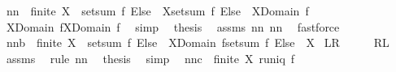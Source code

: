 \begin{isabellebody}
\isanewline
{}\isamarkupfalse%
\ nn{}{}{\isacharcolon}\ \ {\isachardoublequoteopen}finite\ X{\isachardoublequoteclose}\ \ {\isachardoublequoteopen}setsum\ {\isacharparenleft}f\ Else\ {}{\isacharparenright}\ X{\isacharequal}setsum\ {\isacharparenleft}f\ Else\ {}{\isacharparenright}\ {\isacharparenleft}X{\isasyminter}Domain\ f{\isacharparenright}{\isachardoublequoteclose}\ \isanewline
%
\isadelimproof
%
\endisadelimproof
%
\isatagproof
{}\isamarkupfalse%
{\isacharminus}\ \isamarkupfalse%
\ {\isachardoublequoteopen}X{\isasyminter}Domain\ f{\isacharequal}X{\isacharminus}{\isacharparenleft}{\isacharminus}Domain\ f{\isacharparenright}{\isachardoublequoteclose}\ \isamarkupfalse%
\ simp\ \isamarkupfalse%
\ {\isacharquery}thesis\ \isamarkupfalse%
\ assms\ nn{}{}\ nn{}{}\ \isamarkupfalse%
\ fastforce\ \isamarkupfalse%
%
\endisatagproof
{\isafoldproof}%
%
\isadelimproof
\isanewline
%
\endisadelimproof
{}\isamarkupfalse%
\ nn{}{}b{\isacharcolon}\ \ {\isachardoublequoteopen}finite\ X{\isachardoublequoteclose}\ \ {\isachardoublequoteopen}setsum\ {\isacharparenleft}f\ Else\ {}{\isacharparenright}\ {\isacharparenleft}X{\isasyminter}Domain\ f{\isacharparenright}{\isacharequal}setsum\ {\isacharparenleft}f\ Else\ {}{\isacharparenright}\ X{\isachardoublequoteclose}\isanewline
{\isacharparenleft}\ {\isachardoublequoteopen}{\isacharquery}L{\isacharequal}{\isacharquery}R{\isachardoublequoteclose}{\isacharparenright}%
\isadelimproof
\ %
\endisadelimproof
%
\isatagproof
{}\isamarkupfalse%
\ {\isacharminus}\ \isamarkupfalse%
\ {\isachardoublequoteopen}{\isacharquery}R{\isacharequal}{\isacharquery}L{\isachardoublequoteclose}\ \isamarkupfalse%
\ assms\ \isamarkupfalse%
\ {\isacharparenleft}rule\ nn{}{}{\isacharparenright}\ \isamarkupfalse%
\ {\isacharquery}thesis\ \isamarkupfalse%
\ simp\ \isamarkupfalse%
%
\endisatagproof
{\isafoldproof}%
%
\isadelimproof
%
\endisadelimproof
\isanewline
\isanewline
{}\isamarkupfalse%
\ nn{}{}c{\isacharcolon}\ \ {\isachardoublequoteopen}finite\ X{\isachardoublequoteclose}\ {\isachardoublequoteopen}runiq\ f{\isachardoublequoteclose}\ \ \isanewline

\end{isabellebody}

